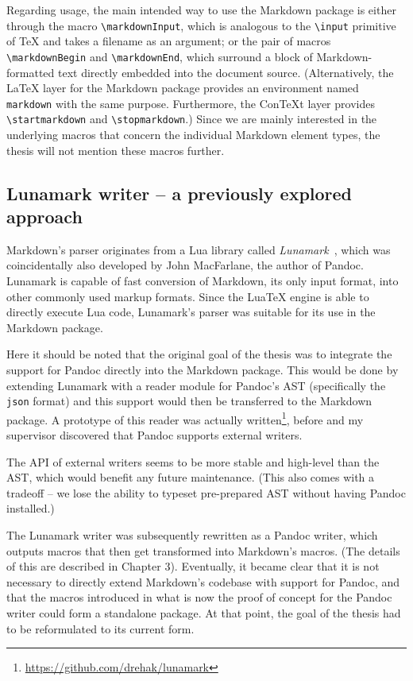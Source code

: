 \documentclass[
  digital,     %
  oneside,     %
  nosansbold,  %
  nocolorbold, %
  lof,         %
  nolot,       %
]{fithesis4}
\newcommand\macro[1]{\texttt{\textbackslash{}{#1}}}
\begin{document}
Regarding usage, the main intended way to use the Markdown package is either through the macro \macro{markdownInput}, which is analogous to the \macro{input} primitive of \TeX{} and takes a filename as an argument; or the pair of macros \macro{markdownBegin} and \macro{markdownEnd}, which surround a block of Markdown-formatted text directly embedded into the document source. (Alternatively, the \LaTeX{} layer for the Markdown package provides an environment named \texttt{markdown} with the same purpose. Furthermore, the Con\TeX{}t layer provides \macro{startmarkdown} and \macro{stopmarkdown}.) Since we are mainly interested in the underlying macros that concern the individual Markdown element types, the thesis will not mention these macros further.

\subsection{Lunamark writer -- a previously explored approach}
Markdown's parser originates from a Lua library called \emph{Lunamark}~\cite{lunamark}, which was coincidentally also developed by John MacFarlane, the author of Pandoc. Lunamark is capable of fast conversion of Markdown, its only input format, into other commonly used markup formats. Since the Lua\TeX{} engine is able to directly execute Lua code, Lunamark's parser was suitable for its use in the Markdown package.

Here it should be noted that the original goal of the thesis was to integrate the support for Pandoc directly into the Markdown package. This would be done by extending Lunamark with a reader module for Pandoc's AST (specifically the \texttt{json} format) and this support would then be transferred to the Markdown package. A prototype of this reader was actually written\footnote{\url{https://github.com/drehak/lunamark}}, before and my supervisor discovered that Pandoc supports external writers.

The API of external writers seems to be more stable and high-level than the AST, which would benefit any future maintenance. (This also comes with a tradeoff -- we lose the ability to typeset pre-prepared AST without having Pandoc installed.)

The Lunamark writer was subsequently rewritten as a Pandoc writer, which outputs macros that then get transformed into Markdown's macros. (The details of this are described in Chapter 3). Eventually, it became clear that it is not necessary to directly extend Markdown's codebase with support for Pandoc, and that the macros introduced in what is now the proof of concept for the Pandoc writer could form a standalone package. At that point, the goal of the thesis had to be reformulated to its current form.
\end{document}
